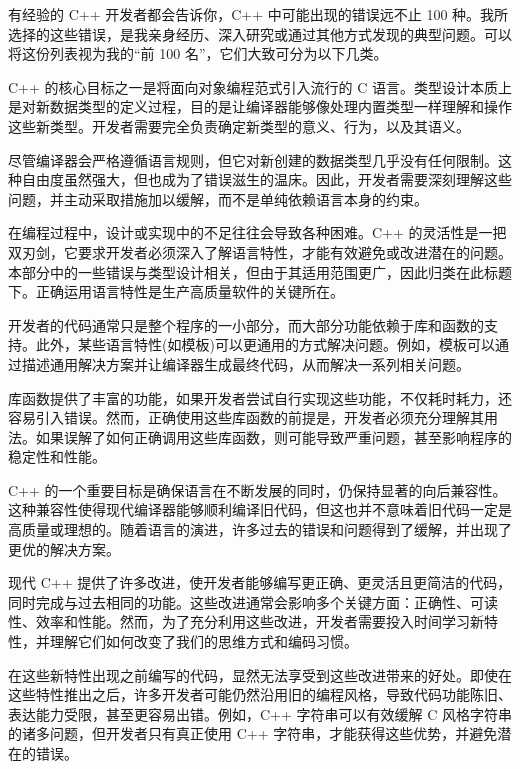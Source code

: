
有经验的 C++ 开发者都会告诉你，C++ 中可能出现的错误远不止 100 种。我所选择的这些错误，是我亲身经历、深入研究或通过其他方式发现的典型问题。可以将这份列表视为我的“前 100 名”，它们大致可分为以下几类。


C++ 的核心目标之一是将面向对象编程范式引入流行的 C 语言。类型设计本质上是对新数据类型的定义过程，目的是让编译器能够像处理内置类型一样理解和操作这些新类型。开发者需要完全负责确定新类型的意义、行为，以及其语义。

尽管编译器会严格遵循语言规则，但它对新创建的数据类型几乎没有任何限制。这种自由度虽然强大，但也成为了错误滋生的温床。因此，开发者需要深刻理解这些问题，并主动采取措施加以缓解，而不是单纯依赖语言本身的约束。


在编程过程中，设计或实现中的不足往往会导致各种困难。C++ 的灵活性是一把双刃剑，它要求开发者必须深入了解语言特性，才能有效避免或改进潜在的问题。本部分中的一些错误与类型设计相关，但由于其适用范围更广，因此归类在此标题下。正确运用语言特性是生产高质量软件的关键所在。


开发者的代码通常只是整个程序的一小部分，而大部分功能依赖于库和函数的支持。此外，某些语言特性(如模板)可以更通用的方式解决问题。例如，模板可以通过描述通用解决方案并让编译器生成最终代码，从而解决一系列相关问题。

库函数提供了丰富的功能，如果开发者尝试自行实现这些功能，不仅耗时耗力，还容易引入错误。然而，正确使用这些库函数的前提是，开发者必须充分理解其用法。如果误解了如何正确调用这些库函数，则可能导致严重问题，甚至影响程序的稳定性和性能。


C++ 的一个重要目标是确保语言在不断发展的同时，仍保持显著的向后兼容性。这种兼容性使得现代编译器能够顺利编译旧代码，但这也并不意味着旧代码一定是高质量或理想的。随着语言的演进，许多过去的错误和问题得到了缓解，并出现了更优的解决方案。

现代 C++ 提供了许多改进，使开发者能够编写更正确、更灵活且更简洁的代码，同时完成与过去相同的功能。这些改进通常会影响多个关键方面：正确性、可读性、效率和性能。然而，为了充分利用这些改进，开发者需要投入时间学习新特性，并理解它们如何改变了我们的思维方式和编码习惯。


在这些新特性出现之前编写的代码，显然无法享受到这些改进带来的好处。即使在这些特性推出之后，许多开发者可能仍然沿用旧的编程风格，导致代码功能陈旧、表达能力受限，甚至更容易出错。例如，C++ 字符串可以有效缓解 C 风格字符串的诸多问题，但开发者只有真正使用 C++ 字符串，才能获得这些优势，并避免潜在的错误。

